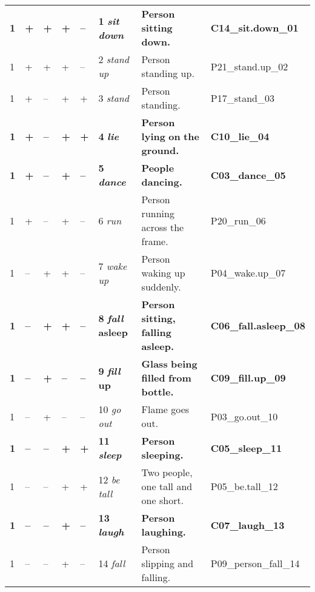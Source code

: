 \begin{tabularx}{\textwidth}{llllllQl}
\midrule
\textbf{1} 	& \textbf{+} 	& \textbf{+} 	& \textbf{+} 	& \textbf{--} 	& \textbf{1} 	\textbf{\textit{sit down}}& \textbf{Person} \textbf{sitting} \textbf{down.} 	& \textbf{C14\_sit.down\_01} \\
1 		& + 		& + 		& + 		& -- 		& 2 		\textit{stand up}& Person standing up. 						& P21\_stand.up\_02  \\
1 		& + 		& -- 		& + 		& + 		& 3 		\textit{stand}&Person standing.				& P17\_stand\_03  \\
\textbf{1} 	& \textbf{+} 	& \textbf{--} & \textbf{+} 	& \textbf{+} & \textbf{4} 	\textbf{\textit{lie}}& \textbf{Person} \textbf{lying} \textbf{on} \textbf{the} \textbf{ground.} & \textbf{C10\_lie\_04}  \\
\textbf{1} 	& \textbf{+} 	& \textbf{--} & \textbf{+} 	& \textbf{--} 	& \textbf{5} 	\textbf{\textit{dance}}&\textbf{People} \textbf{dancing.} & \textbf{C03\_dance\_05} \\
1 		& + 		& -- 		& + 		& -- 		& 6 		\textit{run}& Person running across the frame.					&  P20\_run\_06  \\
1 		& -- 	& + 		& + 		& -- 		& 7 		\textit{wake up}& Person waking up suddenly.					&  P04\_wake.up\_07  \\
\textbf{1} 	& \textbf{--}& \textbf{+} & \textbf{+} 	& \textbf{--} 	& \textbf{8} 	\textbf{\textit{fall} \textbf{asleep}}& \textbf{Person} \textbf{sitting,} \textbf{falling} \textbf{asleep.}&  \textbf{C06\_fall.asleep\_08}  \\
\textbf{1} 	& \textbf{--}& \textbf{+} & \textbf{--}& \textbf{--} 	& \textbf{9} 	\textbf{\textit{fill} \textbf{up}}& \textbf{Glass} \textbf{being} \textbf{filled} \textbf{from} \textbf{bottle.} & \textbf{C09\_fill.up\_09} \\
1 		& -- 	& + 		& --		& -- 		& 10 		\textit{go out}& Flame goes out. 						& P03\_go.out\_10  \\
\textbf{1} 	& \textbf{--}& \textbf{--} & \textbf{+} & \textbf{+} & \textbf{11} 	\textbf{\textit{sleep}}& \textbf{Person} \textbf{sleeping.} 			& \textbf{C05\_sleep\_11} \\
1 		& -- 	& -- 		& + 		& + 		& 12 		\textit{be tall}& Two people, one tall and one short. 				& P05\_be.tall\_12 \\
\textbf{1} 	& \textbf{--}& \textbf{--} & \textbf{+} & \textbf{--} 	& \textbf{13} 	\textbf{\textit{laugh}}& \textbf{Person} \textbf{laughing.}			 & \textbf{C07\_laugh\_13} \\
1 		& -- 	& -- 		& + 		& -- 		& 14 		\textit{fall}& Person slipping and falling. 					& P09\_person\_fall\_14 \\

\end{tabularx}
